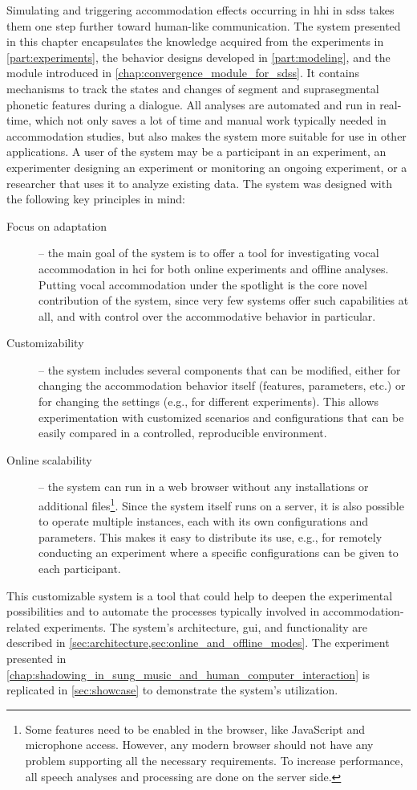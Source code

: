 Simulating and triggering accommodation effects occurring in \ac{hhi} in \acp{sds} takes them one step further toward human-like communication.
The system presented in this chapter encapsulates the knowledge acquired from the experiments in \cref{part:experiments}, the behavior designs developed in \cref{part:modeling}, and the module introduced in \cref{chap:convergence_module_for_sdss}.
It contains mechanisms to track the states and changes of segment and suprasegmental phonetic features during a dialogue.
All analyses are automated and run in real-time, which not only saves a lot of time and manual work typically needed in accommodation studies, but also makes the system more suitable for use in other applications.
A user of the system may be a participant in an experiment, an experimenter designing an experiment or monitoring an ongoing experiment, or a researcher that uses it to analyze existing data.
The system was designed with the following key principles in mind:
%
\begin{description}
	\item[Focus on adaptation] --
	the main goal of the system is to offer a tool for investigating vocal accommodation in \ac{hci} for both online experiments and offline analyses.
	Putting vocal accommodation under the spotlight is the core novel contribution of the system, since very few systems offer such capabilities at all, and with control over the accommodative behavior in particular.
	
	\item[Customizability] --
	the system includes several components that can be modified, either for changing the accommodation behavior itself (features, parameters, etc.) or for changing the settings (e.g., for different experiments).
	This allows experimentation with customized scenarios and configurations that can be easily compared in a controlled, reproducible environment.
	
	\item[Online scalability] --
	the system can run in a web browser without any installations or additional files\footnote{Some features need to be enabled in the browser, like JavaScript and microphone access.
	However, any modern browser should not have any problem supporting all the necessary requirements.
	To increase performance, all speech analyses and processing are done on the server side.}.
	Since the system itself runs on a server, it is also possible to operate multiple instances, each with its own configurations and parameters.
	This makes it easy to distribute its use, e.g., for remotely conducting an experiment where a specific configurations can be given to each participant.
\end{description}
%
This customizable system is a tool that could help to deepen the experimental possibilities and to automate the processes typically involved in accommodation-related experiments.
The system's architecture, \ac{gui}, and functionality are described in \cref{sec:architecture,sec:online_and_offline_modes}.
The experiment presented in \cref{chap:shadowing_in_sung_music_and_human_computer_interaction} is replicated in \cref{sec:showcase} to demonstrate the system's utilization.


